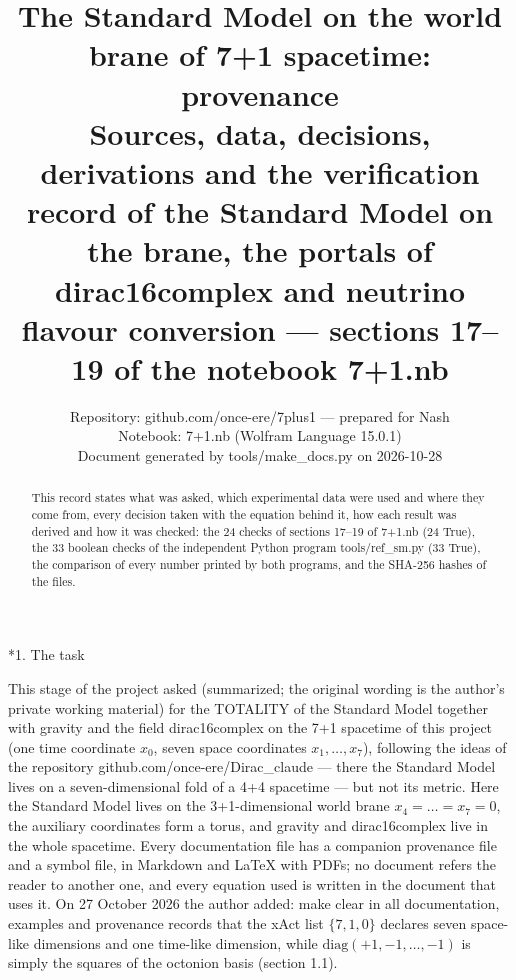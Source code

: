 \documentclass[10pt,a4paper]{article}
\makeatletter
\renewcommand\section{\@startsection{section}{1}{\z@}{-3.5ex \@plus -1ex \@minus -.2ex}{2.3ex \@plus.2ex}{\normalfont\Large\bfseries\raggedright}}
\makeatother
\begin{document}
\title{The Standard Model on the world brane of 7+1 spacetime: provenance\\[0.4em]\large Sources, data, decisions, derivations and the verification record of the Standard Model on the brane, the portals of dirac16complex and neutrino flavour conversion — sections 17–19 of the notebook 7+1.nb}
\author{Repository: github.com/once-ere/7plus1 — prepared for Nash\\ Notebook: 7+1.nb (Wolfram Language 15.0.1)\\ Document generated by tools/make\_docs.py on 2026-10-28}
\date{}
\maketitle
\begin{abstract}
This record states what was asked, which experimental data were used and where they come from, every decision taken with the equation behind it, how each result was derived and how it was checked: the 24 checks of sections 17–19 of 7+1.nb (24 True), the 33 boolean checks of the independent Python program tools/ref\_sm.py (33 True), the comparison of every number printed by both programs, and the SHA-256 hashes of the files.
\end{abstract}
\tableofcontents
{}\section*{1. The task}
This stage of the project asked (summarized; the original wording is the author’s private working material) for the TOTALITY of the Standard Model together with gravity and the field dirac16complex on the 7+1 spacetime of this project (one time coordinate $x_0$, seven space coordinates $x_1,\dots,x_7$), following the ideas of the repository github.com/once-ere/Dirac\_claude — there the Standard Model lives on a seven-dimensional fold of a 4+4 spacetime — but not its metric. Here the Standard Model lives on the 3+1-dimensional world brane $x_4=\dots=x_7=0$, the auxiliary coordinates form a torus, and gravity and dirac16complex live in the whole spacetime. Every documentation file has a companion provenance file and a symbol file, in Markdown and LaTeX with PDFs; no document refers the reader to another one, and every equation used is written in the document that uses it. On 27 October 2026 the author added: make clear in all documentation, examples and provenance records that the xAct list $\{7,1,0\}$ declares seven space-like dimensions and one time-like dimension, while $\mathrm{diag}(+1,-1,\dots,-1)$ is simply the squares of the octonion basis (section 1.1).
\end{document}
